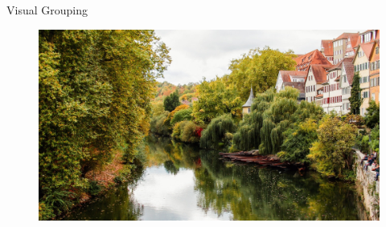 \documentclass[10pt,xcolor=svgnames]{beamer} %
\begin{document}
\begin{frame}{Visual Grouping}
\begin{figure}
    \centering
    \includegraphics[width=\textwidth]{pictures/tubingenPicture.jpeg}
    \label{fig:tubingen}
\end{figure}
\end{frame}
\end{document}
